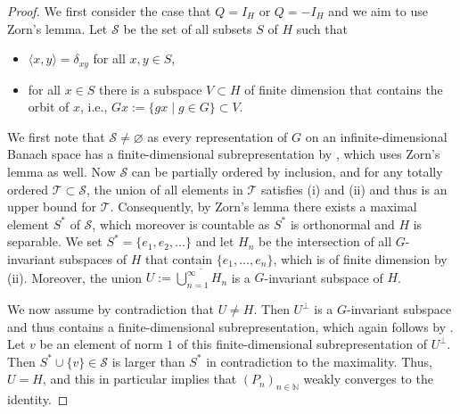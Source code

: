 \documentclass[pdftex]{sigma}
\numberwithin{equation}{section}
\theoremstyle{definition}
\begin{document}
\begin{proof}
We first consider the case that $Q=I_H$ or $Q=-I_H$ and we aim to use Zorn's lemma. Let $\mathcal{S}$ be the set of all subsets $S$ of $H$ such that
\begin{itemize}\itemsep=0pt
 \item[(i)] $\langle x,y\rangle=\delta_{xy}$ for all $x,y\in S$,
 \item[(ii)] for all $x\in S$ there is a subspace $V\subset H$ of finite dimension that contains the orbit of $x$, i.e.,
$Gx:=\{gx \mid g \in G\}\subset V$.
\end{itemize}
We first note that $\mathcal{S}\neq\varnothing$ as every representation of $G$ on an infinite-dimensional Banach space has a finite-dimensional subrepresentation by \cite[Corollary~5.4\,(a)]{IzeVignoli}, which uses Zorn's lemma as well. Now $\mathcal{S}$ can be partially ordered by inclusion, and for any totally ordered $\mathcal{T}\subset\mathcal{S}$, the union of all elements in $\mathcal{T}$ satisfies (i) and (ii) and thus is an upper bound for $\mathcal{T}$. Consequently, by Zorn's lemma there exists a maximal element $S^\ast$ of $\mathcal{S}$, which moreover is countable as $S^\ast$ is orthonormal and $H$ is separable. We set $S^\ast=\{e_1,e_2,\dots\}$ and let $H_n$ be the intersection of all $G$-invariant subspaces of $H$ that contain $\{e_1,\dots,e_n\}$, which is of finite dimension by (ii). Moreover, the union $U:=\overline{\bigcup^\infty_{n=1}H_n}$ is a $G$-invariant subspace of $H$.

We now assume by contradiction that $U\neq H$. Then $U^\perp$ is a $G$-invariant subspace and thus contains a finite-dimensional subrepresentation, which again follows by \cite[Corollary~5.4\,(a)]{IzeVignoli}. Let $v$ be an element of norm $1$ of this finite-dimensional subrepresentation of $U^\perp$. Then \mbox{$S^\ast\cup\{v\}\in\mathcal{S}$} is larger than $S^\ast$ in contradiction to the maximality. Thus, $U=H$, and this in particular implies that $(P_n)_{n\in\mathbb{N}}$ weakly converges to the identity.


\end{proof}
\end{document}
